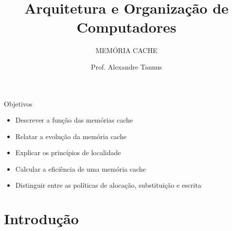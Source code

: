 \documentclass[aspectratio=169,
				xcolor=table]{beamer}
\institute[]{\uppercase{Engenharia de Software}}
\title[]{Arquitetura e Organização de Computadores}
\subtitle[]{\uppercase{Memória Cache}}
\author[]{Prof. Alexandre Tannus}
\date{}
\begin{document}
	\begin{frame}
		\titlepage
	\end{frame}
	
	\begin{frame}{Objetivos}
		\begin{itemize}
			\item Descrever a função das memórias cache 
			\vspace{1em}
			\item Relatar a evolução da memória cache
			\vspace{1em} 
			\item Explicar os princípios de localidade
			\vspace{1em} 
			\item Calcular a eficiência de uma memória cache
			\vspace{1em} 
			\item Distinguir entre as políticas de alocação, substituição e escrita
		\end{itemize}
	\end{frame}



	\begin{frame}
		\tableofcontents		
	\end{frame}	
	
	\section{Introdução}
\end{document}
